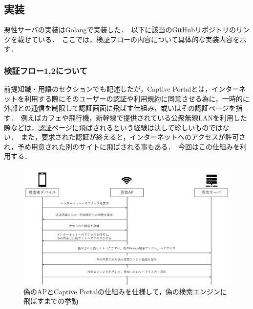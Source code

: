 \documentclass[dvipdfmx]{jsarticle}
\begin{document}
        \subsection{実装}
            悪性サーバの実装はGolangで実装した．\
            以下に該当のGitHubリポジトリのリンクを載せている．\
            ここでは，検証フローの内容について具体的な実装内容を示す．\
            \subsubsection{検証フロー1,2について}
                前提知識・用語のセクションでも記述したが，Captive Portalとは，インターネットを利用する際にそのユーザーの認証や利用規約に同意させる為に，一時的に外部との通信を制限して認証画面に飛ばす仕組み，或いはその認証ページを指す．\
                例えばカフェや飛行機，新幹線で提供されている公衆無線LANを利用した際などは，認証ページに飛ばされるという経験は決して珍しいものではない．\
                また，要求された認証が終えると，インターネットへのアクセスが許可され，予め用意された別のサイトに飛ばされる事もある．\
                今回はこの仕組みを利用する．\
                \begin{figure}
                    \centering
                    \includegraphics[width=15cm]{img/vc-vf-1-2.png}
                    \caption{偽のAPとCaptive Portalの仕組みを仕様して，偽の検索エンジンに飛ばすまでの挙動}
                    \label{flow-no12}
                \end{figure}
\end{document}

